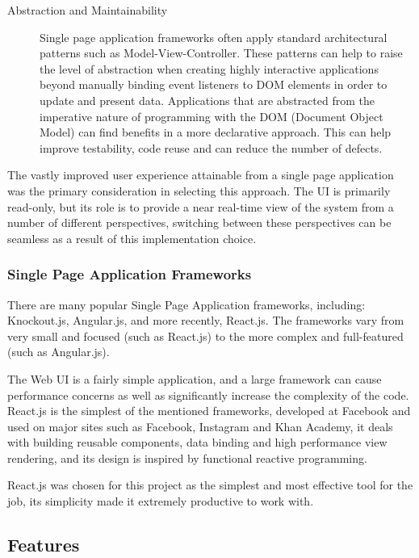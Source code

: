 \documentclass{cshonours}
\begin{document}
\begin{description}
  \item[ Abstraction and Maintainability]
    Single page application frameworks often apply standard architectural patterns such as Model-View-Controller. These patterns can help to raise the level of abstraction when creating highly interactive applications beyond manually binding event listeners to DOM elements in order to update and present data. Applications that are abstracted from the imperative nature of programming with the DOM (Document Object Model) can find benefits in a more declarative approach. This can help improve testability, code reuse and can reduce the number of defects.
\end{description}

The vastly improved user experience attainable from a single page application was the primary consideration in selecting this approach. The UI is primarily read-only, but its role is to provide a near real-time view of the system from a number of different perspectives, switching between these perspectives can be seamless as a result of this implementation choice.

\subsubsection{Single Page Application Frameworks}

There are many popular Single Page Application frameworks, including: Knockout.js, Angular.js, and more recently, React.js. The frameworks vary from very small and focused (such as React.js) to the more complex and full-featured (such as Angular.js).

The Web UI is a fairly simple application, and a large framework can cause performance concerns as well as significantly increase the complexity of the code. React.js is the simplest of the mentioned frameworks, developed at Facebook and used on major sites such as Facebook, Instagram and Khan Academy, it deals with building reusable components, data binding and high performance view rendering, and its design is inspired by functional reactive programming.

React.js was chosen for this project as the simplest and most effective tool for the job, its simplicity made it extremely productive to work with.

\subsection{Features}
\end{document}
